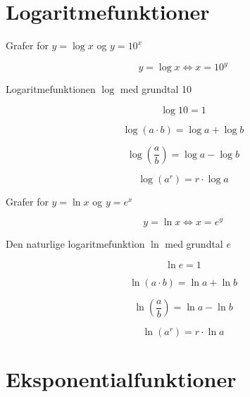 \documentclass[11pt,a5paper,fleqn,leqno]{book}
\begin{document}
\vfill

\section{Logaritmefunktioner}

Grafer for $y = \log x$ og $y = 10^x$

\begin{equation}
y = \log x \Leftrightarrow x = 10^y
\end{equation}

Logaritmefunktionen $\log$ med grundtal 10

\begin{equation}
\log 10 = 1
\end{equation}

\begin{equation}
\log(a \cdot b) = \log a + \log b
\end{equation}

\begin{equation}
\log\left(\frac{a}{b}\right) = \log a - \log b
\end{equation}

\begin{equation}
\log(a^r) = r \cdot \log a
\end{equation}

Grafer for $y = \ln x$ og $y = e^x$

\begin{equation}
y = \ln x \Leftrightarrow x = e^y
\end{equation}

Den naturlige logaritmefunktion $\ln$ med grundtal $e$

\begin{equation}
\ln e = 1
\end{equation}

\begin{equation}
\ln (a \cdot b) = \ln a + \ln b
\end{equation}

\begin{equation}
\ln\left(\frac{a}{b}\right) = \ln a - \ln b
\end{equation}

\begin{equation}
\ln(a^r) = r \cdot \ln a
\end{equation}

\vfill

\section{Eksponentialfunktioner}
\end{document}
